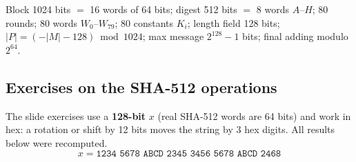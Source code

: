 \begin{mustknow}
Block 1024 bits $=$ 16 words of 64 bits; digest 512 bits $=$ 8 words $A$--$H$; 80 rounds; 80 words $W_0$--$W_{79}$; 80 constants $K_i$; length field 128 bits; $|P| = (-|M| - 128) \bmod 1024$; max message $2^{128} - 1$ bits; final adding modulo $2^{64}$.
\end{mustknow}

\subsection{Exercises on the SHA-512 operations \new}

The slide exercises use a \textbf{128-bit} $x$ (real SHA-512 words are 64 bits) and work in hex: a rotation or shift by 12 bits moves the string by 3 hex digits. All results below were recomputed.
\[
x = \texttt{1234 5678 ABCD 2345 3456 5678 ABCD 2468}
\]

